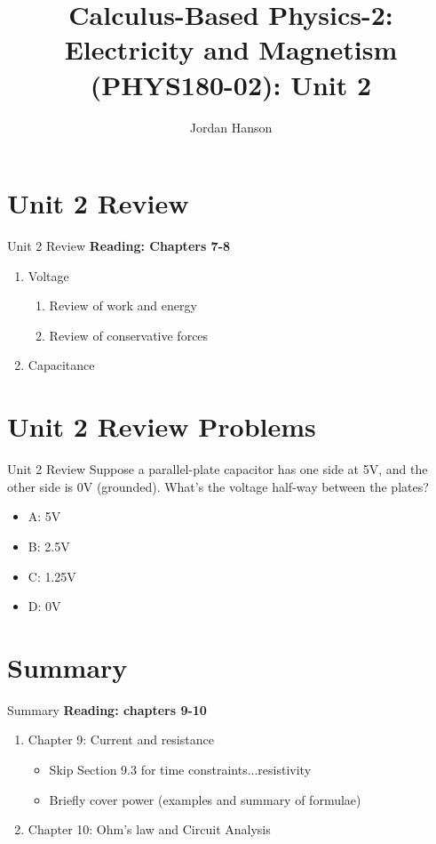 \documentclass{beamer}
\title{Calculus-Based Physics-2: Electricity and Magnetism (PHYS180-02): Unit 2}
\author{Jordan Hanson}
\institute{Whittier College Department of Physics and Astronomy}
\begin{document}
\maketitle

\section{Unit 2 Review}

\begin{frame}{Unit 2 Review}
\textbf{Reading: Chapters 7-8}
\begin{enumerate}
\item Voltage
\begin{enumerate}
\item Review of work and energy
\item Review of conservative forces
\end{enumerate}
\item Capacitance
\end{enumerate}
\end{frame}

\section{Unit 2 Review Problems}

\begin{frame}{Unit 2 Review}
Suppose a parallel-plate capacitor has one side at 5V, and the other side is 0V (grounded).  What's the voltage half-way between the plates?
\begin{itemize}
\item A: 5V
\item B: 2.5V
\item C: 1.25V
\item D: 0V
\end{itemize}
\end{frame}

\section{Summary}

\begin{frame}{Summary}
\textbf{Reading: chapters 9-10}
\begin{enumerate}
\item Chapter 9: Current and resistance
\begin{itemize}
\item Skip Section 9.3 for time constraints...resistivity
\item Briefly cover power (examples and summary of formulae)
\end{itemize}
\item Chapter 10: Ohm's law and Circuit Analysis
\end{enumerate}
\end{frame}
\end{document}
